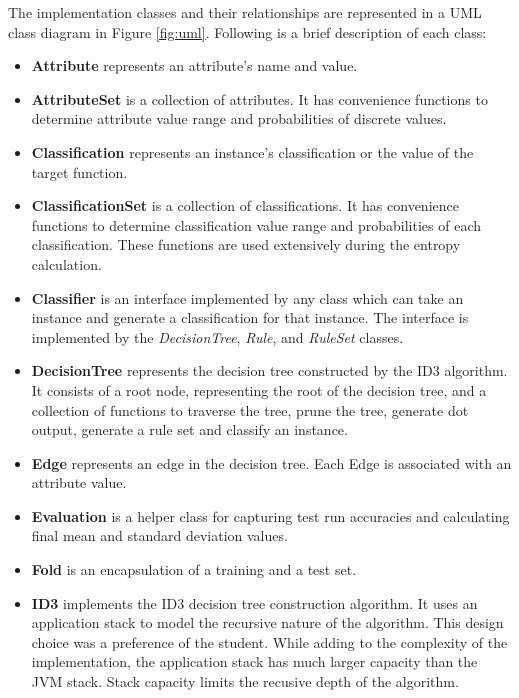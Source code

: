 \documentclass[10pt]{report}
\begin{document}
The implementation classes and their relationships are represented in a UML
class diagram in Figure \ref{fig:uml}. Following is a brief
description of each class:

\begin{itemize}
\item \textbf{Attribute} represents an attribute's name and value.

\item \textbf{AttributeSet} is a collection of attributes. It has
  convenience functions to determine attribute value range and
  probabilities of discrete values.

\item \textbf{Classification} represents an instance's classification
  or the value of the target function.

\item \textbf{ClassificationSet} is a collection of
  classifications. It has convenience functions to determine
  classification value range and probabilities of each
  classification. These functions are used extensively during the
  entropy calculation. 

\item \textbf{Classifier} is an interface implemented by any class
  which can take an instance and generate a classification for that
  instance. The interface is implemented by the \textit{DecisionTree},
  \textit{Rule}, and \textit{RuleSet} classes.

\item \textbf{DecisionTree} represents the decision tree constructed
  by the ID3 algorithm. It consists of a root node, representing the
  root of the decision tree, and a collection of functions to
  traverse the tree, prune the tree, generate dot output, generate a
  rule set and classify
  an instance. 

\item \textbf{Edge} represents an edge in the decision tree. Each Edge
  is associated with an attribute value.

\item \textbf{Evaluation} is a helper class for capturing test run
  accuracies and calculating final mean and standard deviation values.

\item \textbf{Fold} is an encapsulation of a training and a test set.
 
\item \textbf{ID3} implements the ID3 decision tree construction
  algorithm. It uses an application stack to model the recursive
  nature of the algorithm. This design choice was a preference of the
  student. While adding to the complexity of the implementation, the
  application stack has much larger capacity than the JVM stack. Stack
  capacity limits the recusive depth of the algorithm.


\end{itemize}
\end{document}

